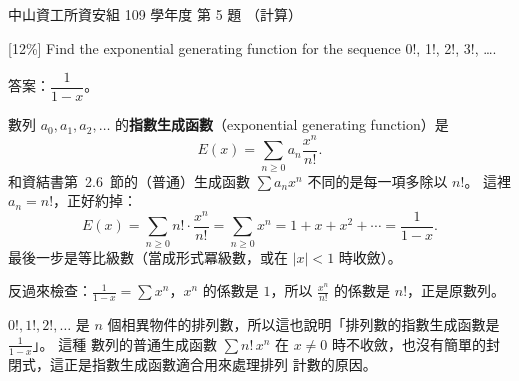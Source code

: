 \begin{pastexam}[label={px:nsysu-109-dmalg-02}]{中山資工所資安組 109 學年度 第 5 題}
（計算）

{[12\%]} Find the exponential generating function for the sequence 0!, 1!, 2!, 3!, \ldots.
\end{pastexam}

\begin{pastsoln}
答案：$\dfrac{1}{1 - x}$。

數列 $a_0, a_1, a_2, \ldots$ 的\textbf{指數生成函數}（exponential generating function）是
\[
E(x) = \sum_{n \ge 0} a_n \frac{x^n}{n!}.
\]
和資結書第~2.6~節的（普通）生成函數 $\sum a_n x^n$ 不同的是每一項多除以 $n!$。 這裡 $a_n = n!$，正好約掉：
\[
E(x) = \sum_{n \ge 0} n! \cdot \frac{x^n}{n!} = \sum_{n \ge 0} x^n = 1 + x + x^2 + \cdots = \frac{1}{1 - x}.
\]
最後一步是等比級數（當成形式冪級數，或在 $|x| < 1$ 時收斂）。

反過來檢查：$\frac{1}{1-x} = \sum x^n$，$x^n$ 的係數是 $1$，所以 $\frac{x^n}{n!}$ 的係數是 $n!$，正是原數列。

$0!, 1!, 2!, \ldots$ 是 $n$ 個相異物件的排列數，所以這也說明「排列數的指數生成函數是 $\frac{1}{1-x}$」。 這種
數列的普通生成函數 $\sum n!\, x^n$ 在 $x \ne 0$ 時不收斂，也沒有簡單的封閉式，這正是指數生成函數適合用來處理排列
計數的原因。
\end{pastsoln}
